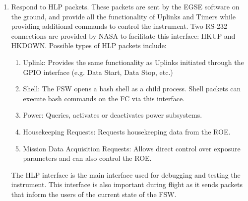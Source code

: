 \begin{enumerate}
  \item Respond to HLP packets. These packets are sent by the EGSE software on the ground, and provide all the functionality of Uplinks and Timers while providing additional commands to control the instrument. Two RS-232 connections are provided by NASA to facilitate this interface: HKUP and HKDOWN. Possible types of HLP packets include:
	\begin{enumerate}
		\item Uplink: Provides the same functionality as Uplinks initiated through the GPIO interface (e.g. Data Start, Data Stop, etc.)
		\item Shell: The FSW opens a bash shell as a child process. Shell packets can execute bash commands on the FC via this interface.
		\item Power: Queries, activates or deactivates power subsystems.
		\item Housekeeping Requests: Requests housekeeping data from the ROE.
		\item Mission Data Acquisition Requests: Allows direct control over exposure parameters and can also control the ROE.
	\end{enumerate}
The HLP interface is the main interface used for debugging and testing the instrument. This interface is also important during flight as it sends packets that inform the users of the current state of the FSW.
	
\end{enumerate}

